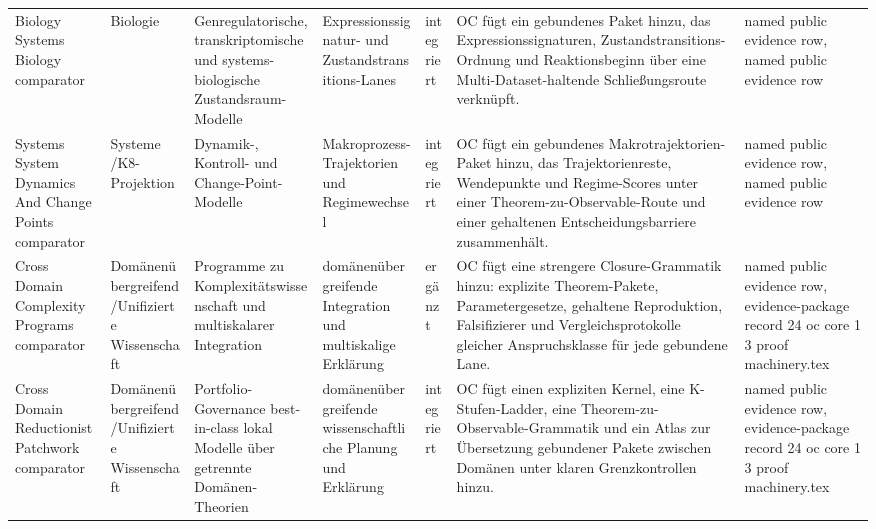 \begin{longtable}{@{}L{0.14\textwidth}L{0.09\textwidth}L{0.14\textwidth}L{0.12\textwidth}L{0.10\textwidth}L{0.18\textwidth}L{0.15\textwidth}@{}}
Biology Systems Biology comparator & Biologie & Genregulatorische, transkriptomische und systems-biologische Zustandsraum-Modelle & Expressionssignatur- und Zustandstransitions-Lanes & integriert & OC fügt ein gebundenes Paket hinzu, das Expressionssignaturen, Zustandstransitions-Ordnung und Reaktionsbeginn über eine Multi-Dataset-haltende Schließungsroute verknüpft. & named public evidence row, named public evidence row \\
Systems System Dynamics And Change Points comparator & Systeme /\allowbreak K8-Projektion & Dynamik-, Kontroll- und Change-Point-Modelle & Makroprozess-Trajektorien und Regimewechsel & integriert & OC fügt ein gebundenes Makrotrajektorien-Paket hinzu, das Trajektorienreste, Wendepunkte und Regime-Scores unter einer Theorem-zu-Observable-Route und einer gehaltenen Entscheidungsbarriere zusammenhält. & named public evidence row, named public evidence row \\
Cross Domain Complexity Programs comparator & Domänenübergreifend /\allowbreak Unifizierte Wissenschaft & Programme zu Komplexitätswissenschaft und multiskalarer Integration & domänenübergreifende Integration und multiskalige Erklärung & ergänzt & OC fügt eine strengere Closure-Grammatik hinzu: explizite Theorem-Pakete, Parametergesetze, gehaltene Reproduktion, Falsifizierer und Vergleichsprotokolle gleicher Anspruchsklasse für jede gebundene Lane. & named public evidence row, \allowbreak evidence-package record 24 oc core 1 3 proof machinery.tex \\
Cross Domain Reductionist Patchwork comparator & Domänenübergreifend /\allowbreak Unifizierte Wissenschaft & Portfolio-Governance best-in-class lokal Modelle über getrennte Domänen-Theorien & domänenübergreifende wissenschaftliche Planung und Erklärung & integriert & OC fügt einen expliziten Kernel, eine K-Stufen-Ladder, eine Theorem-zu-Observable-Grammatik und ein Atlas zur Übersetzung gebundener Pakete zwischen Domänen unter klaren Grenzkontrollen hinzu. & named public evidence row, \allowbreak evidence-package record 24 oc core 1 3 proof machinery.tex \\
\bottomrule
\end{longtable}
\endgroup

